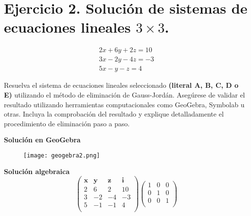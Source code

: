 
\section{Ejercicio 2. Solución de sistemas de ecuaciones lineales $3\times3$.}

\[
    \begin{aligned}
        2x+6y+2z=10\\
        3x-2y-4z=-3 \\
        5x-y-z=4
    \end{aligned}
\]

Resuelva el sistema de ecuaciones lineales seleccionado \textbf{(literal A, B, C, D o E)} utilizando el método de eliminación de Gauss-Jordán. Asegúrese de validar el resultado utilizando herramientas computacionales como GeoGebra, Symbolab u otras. Incluya la comprobación del resultado y explique detalladamente el procedimiento de eliminación paso a paso.

\textbf{Solución en GeoGebra}
\begin{figure}[ht!]
    \centering
    \texttt{[image: geogebra2.png]}
\end{figure}

\textbf{Solución algebraica}
\[
    \left(
        \begin{array}{ccc|c}
            \textbf{x} & \textbf{y} & \textbf{z} & \textbf{i} \\
            2 & 6 & 2 & 10 \\
            3 & -2 & -4 & -3 \\
            5 & -1 & -1 & 4 \\
        \end{array}
    \right)
    \begin{pmatrix}
        1 & 0 & 0 \\
        0 & 1 & 0 \\
        0 & 0 & 1 \\
    \end{pmatrix}
\]

